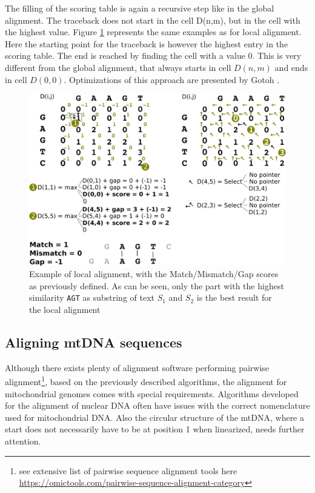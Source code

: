 The filling of the scoring table is again a recursive step like in the global alignment. The traceback does not start in the cell D(n,m), but in the cell with the highest value. Figure \ref{fig:local} represents the same examples as for local alignment. Here the starting point for the traceback is however the highest entry in the scoring table. The end is reached by finding the cell with a value 0. This is very different from the global alignment, that always starts in cell $D(n,m)$ and ends in cell $D(0,0)$. Optimizations of this approach are presented by Gotoh \cite{Gotoh1982}.  
\begin{figure}[H]

    \centering
    \includegraphics[width=1\textwidth]{images/localAlign.png}
    \caption[Example of local alignment]{Example of local alignment, with the Match/Mismatch/Gap scores as previously defined. As can be seen, only the part with the highest similarity \texttt{AGT} as substring of text $S_1$ and $S_2$ is the best result for the local alignment}
    \label{fig:local}
\end{figure}
\subsection{Aligning mtDNA sequences}
Although there exists plenty of alignment software performing pairwise alignment\footnote{see extensive list of pairwise sequence alignment tools here \url{https://omictools.com/pairwise-sequence-alignment-category}}, based on the previously described algorithms, the alignment for mitochondrial genomes comes with special requirements. Algorithms developed for the alignment of nuclear DNA often have issues with the correct nomenclature used for mitochondrial DNA. Also the circular structure of the mtDNA, where a start does not necessarily have to be at position 1 when linearized, needs further attention. 

